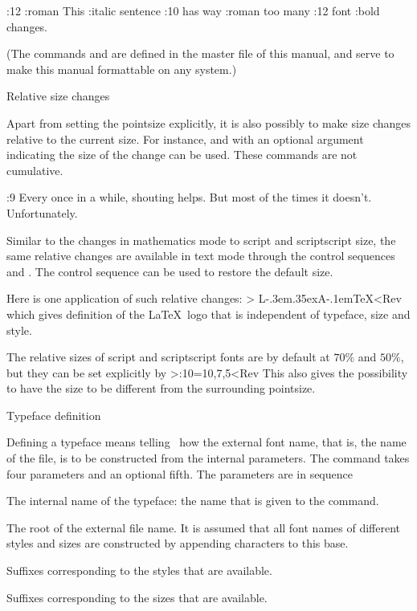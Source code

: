 \Example
\SerifFace \PointSize:12 
\Style:roman This \Style:italic sentence \PointSize:10 has
\SetFont way \SansFace \Style:roman too \SetFont many 
\PointSize:12 \SetFont font \Style:bold changes.
\ExampleStop 

(The commands  and  are defined in
the master file of this manual, and serve to make this manual
formattable on any system.)

\SubSection Relative size changes

Apart from setting the pointsize explicitly, it is also possibly to
make size changes relative to the current size. For instance,
 and  with an optional
argument indicating the size of the change can be used. These
commands are not cumulative.

\Example
\SerifFace
\PointSize:9 \SetFont Every once in a while,\SaveFont
\PointSizeLarger[2] shouting \PointSizeLarger helps.
\PointSizeSmaller[2]But most of the times it doesn't.
\RestoreFont Unfortunately.
\ExampleStop

Similar to the changes in mathematics mode to script and scriptscript
size, the same relative changes are available in text mode through
the control sequences  and . 
The control
sequence  can be used to restore the default size.

Here is one application of such relative changes:
\Ver>
L\kern -.3em\raise .35ex\hbox {\script A}\kern -.1em\TeX<Rev
which gives definition of the \LaTeX\ logo that is independent
of typeface, size and style.

The relative sizes of script and scriptscript fonts are by default at
$70\%$ and $50\%$, but they can be set explicitly by
\Ver>\PointSizeScriptSizes:10=10,7,5<Rev
This also gives the possibility to have the  size to be
different from the surrounding pointsize.

\SubSection Typeface definition

Defining a typeface means telling \Lollipop\ how the external font
name, that is, the name of the  file, is to be constructed from
the internal parameters. The command  takes four
parameters and an optional fifth. The parameters are in sequence
\Enumerate\item The internal name of the typeface: the name that is
given to the  command.
\item The root of the external file name. It is assumed that all
font names of different styles and sizes are constructed by appending
characters to this base.
\item Suffixes corresponding to the styles that are available.
\item Suffixes corresponding to the sizes that are available.
\>

